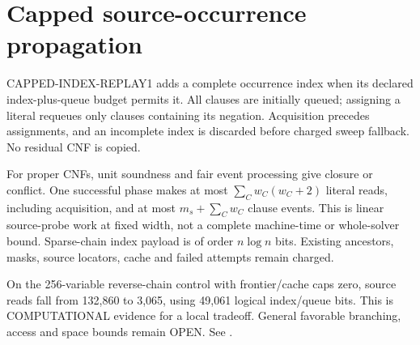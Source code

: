 \section{Capped source-occurrence propagation}
CAPPED-INDEX-REPLAY1 adds a complete occurrence index when its declared
index-plus-queue budget permits it. All clauses are initially queued;
assigning a literal requeues only clauses containing its negation.
Acquisition precedes assignments, and an incomplete index is discarded
before charged sweep fallback. No residual CNF is copied.

For proper CNFs, unit soundness and fair event processing give closure
or conflict. One successful phase makes at most
$\sum_C w_C(w_C+2)$ literal reads, including acquisition, and at most
$m_s+\sum_Cw_C$ clause events. This is linear source-probe work at fixed
width, not a complete machine-time or whole-solver bound. Sparse-chain
index payload is of order $n\log n$ bits. Existing ancestors, masks,
source locators, cache and failed attempts remain charged.

On the 256-variable reverse-chain control with frontier/cache caps zero,
source reads fall from 132,860 to 3,065, using 49,061 logical index/queue
bits. This is COMPUTATIONAL evidence for a local tradeoff. General
favorable branching, access and space bounds remain OPEN. See
.
